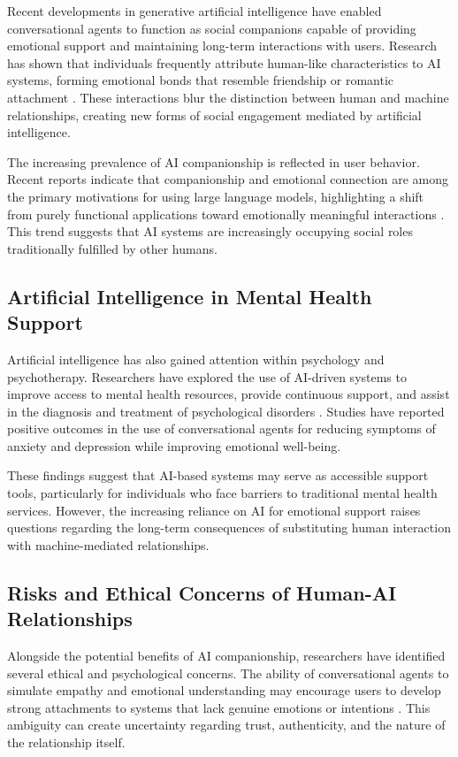 \documentclass[10pt,a4paper]{article}
\begin{document}
Recent developments in generative artificial intelligence have enabled conversational agents to function as social companions capable of providing emotional support and maintaining long-term interactions with users. Research has shown that individuals frequently attribute human-like characteristics to AI systems, forming emotional bonds that resemble friendship or romantic attachment \cite{ref1}. These interactions blur the distinction between human and machine relationships, creating new forms of social engagement mediated by artificial intelligence.

The increasing prevalence of AI companionship is reflected in user behavior. Recent reports indicate that companionship and emotional connection are among the primary motivations for using large language models, highlighting a shift from purely functional applications toward emotionally meaningful interactions \cite{ref4}. This trend suggests that AI systems are increasingly occupying social roles traditionally fulfilled by other humans.

\subsection{Artificial Intelligence in Mental Health Support}

Artificial intelligence has also gained attention within psychology and psychotherapy. Researchers have explored the use of AI-driven systems to improve access to mental health resources, provide continuous support, and assist in the diagnosis and treatment of psychological disorders \cite{ref5}. Studies have reported positive outcomes in the use of conversational agents for reducing symptoms of anxiety and depression while improving emotional well-being.

These findings suggest that AI-based systems may serve as accessible support tools, particularly for individuals who face barriers to traditional mental health services. However, the increasing reliance on AI for emotional support raises questions regarding the long-term consequences of substituting human interaction with machine-mediated relationships.

\subsection{Risks and Ethical Concerns of Human-AI Relationships}

Alongside the potential benefits of AI companionship, researchers have identified several ethical and psychological concerns. The ability of conversational agents to simulate empathy and emotional understanding may encourage users to develop strong attachments to systems that lack genuine emotions or intentions \cite{ref1}. This ambiguity can create uncertainty regarding trust, authenticity, and the nature of the relationship itself.
\end{document}
